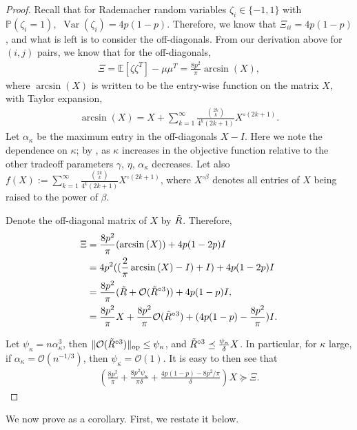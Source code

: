 \documentclass[12pt]{article}
\theoremstyle{definition}
\numberwithin{equation}{section}
\numberwithin{figure}{section}
\newcommand{\var}{\operatorname{Var}}
\newcommand{\calO}{{\mathcal O}}
\numberwithin{equation}{section}
\numberwithin{figure}{section}
\begin{document}
\begin{proof}
Recall that for Rademacher random variables $\zeta_i \in \{-1,1\}$ with $\mathbb{P}(\zeta_i = 1),$ $\var(\zeta_i) = 4p(1-p)$. Therefore, we know that $\Xi_{ii} = 4p(1-p)$, and what is left is to consider the off-diagonals. From our derivation above for $(i,j)$ pairs, we know that for the off-diagonals,
\begin{align*}
   \Xi = \mathbb{E}[\zeta \zeta^T] - \mu \mu^T = \frac{8p^2}{\pi} \arcsin{(X)}, 
\end{align*}
where $\arcsin{(X)}$ is written to be the entry-wise function on the matrix $X$, with Taylor expansion,
\begin{align*}
    \arcsin{(X)} = X + \sum_{k=1}^\infty \frac{\binom{2k}{k}}{4^k (2k + 1)} X^{\circ (2k+1)}.
\end{align*}
Let $\alpha_\kappa$ be the maximum entry in the off-diagonals $X - I$. Here we note the dependence on $\kappa$; by , as $\kappa$ increases in the objective function relative to the other tradeoff parameters $\gamma$, $\eta$, $\alpha_\kappa$ decreases. Let also $f(X):= \sum_{k=1}^\infty \frac{\binom{2k}{k}}{4^k (2k + 1)} X^{\circ (2k+1)}$, where $X^{\circ \beta}$ denotes all entries of $X$ being raised to the power of $\beta$. 

Denote the off-diagonal matrix of $X$ by $\Tilde{R}$. Therefore,
\begin{align*}
     \Xi &= \frac{8 p^2}{\pi} (\arcsin{(X)}) + 4p(1-2p)I \\
     &=  4p^2((\frac{2}{\pi}\arcsin{(X)} -I) + I) + 4p(1-2p)I \\
     &= \frac{8 p^2}{\pi} (\Tilde{R} + \calO(\Tilde{R}^{\circ 3})) + 4p(1-p)I, \\
     &= \frac{8 p^2}{\pi} X + \frac{8 p^2}{\pi} \calO(\Tilde{R}^{\circ 3})  + (4p(1-p) - \frac{8p^2}{\pi})I.
\end{align*} 

Let $\psi_\kappa = n \alpha_\kappa^{3}$, then $\| \calO(\Tilde{R}^{\circ 3})\|_{\text{op}} \leq \psi_\kappa$, and $\Tilde{R}^{\circ 3} \preceq \frac{\psi_\kappa}{\delta} X$. In particular, for $\kappa$ large, if $\alpha_\kappa = \calO(n^{-1/3})$, then $\psi_\kappa = \calO(1).$ It is easy to then see that
\begin{align*}
   \left( \frac{8p^2}{\pi}  + \frac{8p^2 \psi_\kappa}{\pi \delta} + \frac{4p(1-p) - 8p^2/\pi}{\delta}  \right)X \succeq \Xi. 
\end{align*}
\end{proof}
We now prove  as a corollary. First, we restate it below.
\begingroup
\end{document}
